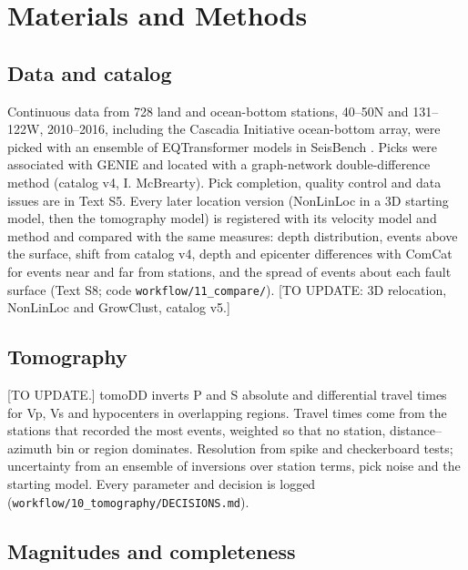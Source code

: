 \documentclass[11pt]{article}
\begin{document}
\section{Materials and Methods}\label{materials-and-methods}

\subsection{Data and catalog}\label{data-and-catalog}

Continuous data from 728 land and ocean-bottom stations, 40--50\textdegree{}N and
131--122\textdegree{}W, 2010--2016, including the Cascadia Initiative ocean-bottom
array, were picked with an ensemble of EQTransformer models
\citep{Mousavi2020, Yuan2023} in SeisBench \citep{Woollam2022}. Picks
were associated with GENIE \citep{McBrearty2023} and located with a
graph-network double-difference method \citep{McBrearty2025} (catalog
v4, I. McBrearty). Pick completion, quality control and data issues are
in Text S5. Every later location version (NonLinLoc in a 3D starting
model, then the tomography model) is registered with its velocity model
and method and compared with the same measures: depth distribution,
events above the surface, shift from catalog v4, depth and epicenter
differences with ComCat for events near and far from stations, and the
spread of events about each fault surface (Text S8; code
\texttt{workflow/11\_compare/}). {[}TO UPDATE: 3D relocation, NonLinLoc
and GrowClust, catalog v5.{]}

\subsection{Tomography}\label{tomography}

{[}TO UPDATE.{]} tomoDD \citep{Zhang2003} inverts P and S absolute and
differential travel times for Vp, Vs and hypocenters in overlapping
regions. Travel times come from the stations that recorded the most
events, weighted so that no station, distance--azimuth bin or region
dominates. Resolution from spike and checkerboard tests; uncertainty
from an ensemble of inversions over station terms, pick noise and the
starting model. Every parameter and decision is logged
(\texttt{workflow/10\_tomography/DECISIONS.md}).

\subsection{Magnitudes and
completeness}\label{magnitudes-and-completeness}
\end{document}
